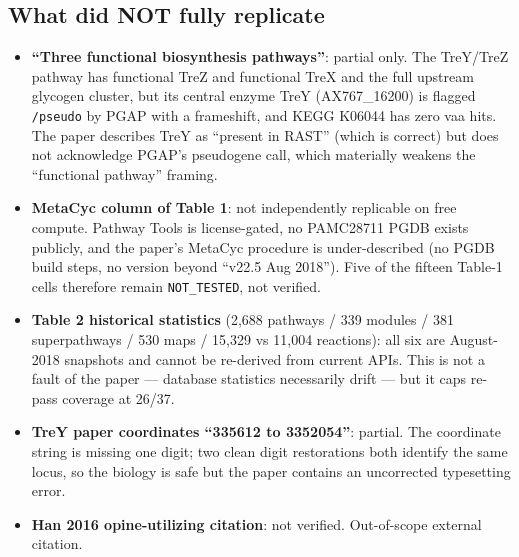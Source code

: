 \documentclass[11pt,letterpaper]{article}
\begin{document}
\subsection*{What did NOT fully replicate}
\begin{itemize}[leftmargin=1.2em,itemsep=1pt]
  \item \textbf{``Three functional biosynthesis pathways''}: partial only. The TreY/TreZ pathway has functional TreZ and functional TreX and the full upstream glycogen cluster, but its central enzyme TreY (AX767\_16200) is flagged \texttt{/pseudo} by PGAP with a frameshift, and KEGG K06044 has zero vaa hits. The paper describes TreY as ``present in RAST'' (which is correct) but does not acknowledge PGAP's pseudogene call, which materially weakens the ``functional pathway'' framing.
  \item \textbf{MetaCyc column of Table 1}: not independently replicable on free compute. Pathway Tools is license-gated, no PAMC28711 PGDB exists publicly, and the paper's MetaCyc procedure is under-described (no PGDB build steps, no version beyond ``v22.5 Aug 2018''). Five of the fifteen Table-1 cells therefore remain \texttt{NOT\_TESTED}, not verified.
  \item \textbf{Table 2 historical statistics} (2{,}688 pathways / 339 modules / 381 superpathways / 530 maps / 15{,}329 vs 11{,}004 reactions): all six are August-2018 snapshots and cannot be re-derived from current APIs. This is not a fault of the paper --- database statistics necessarily drift --- but it caps re-pass coverage at 26/37.
  \item \textbf{TreY paper coordinates ``335612 to 3352054''}: partial. The coordinate string is missing one digit; two clean digit restorations both identify the same locus, so the biology is safe but the paper contains an uncorrected typesetting error.
  \item \textbf{Han 2016 opine-utilizing citation}: not verified. Out-of-scope external citation.
\end{itemize}
\end{document}
